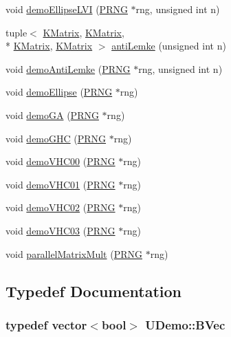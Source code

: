 \begin{DoxyCompactItemize}
\item 
void \hyperlink{namespace_u_demo_ae2d055dcadc44738d44dd94e8fb22365}{demo\-Ellipse\-L\-V\-I} (\hyperlink{class_k_base_1_1_p_r_n_g}{P\-R\-N\-G} $\ast$rng, unsigned int n)
\item 
tuple$<$ \hyperlink{class_k_base_1_1_k_matrix}{K\-Matrix}, \hyperlink{class_k_base_1_1_k_matrix}{K\-Matrix}, \\*
\hyperlink{class_k_base_1_1_k_matrix}{K\-Matrix}, \hyperlink{class_k_base_1_1_k_matrix}{K\-Matrix} $>$ \hyperlink{namespace_u_demo_ab5f1c490cbcf10b636e842c296660839}{anti\-Lemke} (unsigned int n)
\item 
void \hyperlink{namespace_u_demo_aef84eccfcd37c2b2a9ecd615cd6fe0d5}{demo\-Anti\-Lemke} (\hyperlink{class_k_base_1_1_p_r_n_g}{P\-R\-N\-G} $\ast$rng, unsigned int n)
\item 
void \hyperlink{namespace_u_demo_af8246a8ce2e14aa232a0f33795ced5eb}{demo\-Ellipse} (\hyperlink{class_k_base_1_1_p_r_n_g}{P\-R\-N\-G} $\ast$rng)
\item 
void \hyperlink{namespace_u_demo_adac022980ecd7d991bb84df4eb866d55}{demo\-G\-A} (\hyperlink{class_k_base_1_1_p_r_n_g}{P\-R\-N\-G} $\ast$rng)
\item 
void \hyperlink{namespace_u_demo_aea15b24e19367171016a278dd77d1fd4}{demo\-G\-H\-C} (\hyperlink{class_k_base_1_1_p_r_n_g}{P\-R\-N\-G} $\ast$rng)
\item 
void \hyperlink{namespace_u_demo_a8fbc519a5705651a36334568bbf49fb1}{demo\-V\-H\-C00} (\hyperlink{class_k_base_1_1_p_r_n_g}{P\-R\-N\-G} $\ast$rng)
\item 
void \hyperlink{namespace_u_demo_a118b5e21dc5017be5c67ebc7cdaf0ffd}{demo\-V\-H\-C01} (\hyperlink{class_k_base_1_1_p_r_n_g}{P\-R\-N\-G} $\ast$rng)
\item 
void \hyperlink{namespace_u_demo_a461edce07dee22a26059481b8d8c173f}{demo\-V\-H\-C02} (\hyperlink{class_k_base_1_1_p_r_n_g}{P\-R\-N\-G} $\ast$rng)
\item 
void \hyperlink{namespace_u_demo_a50316f5d3a03fcdddc7451745d959e2e}{demo\-V\-H\-C03} (\hyperlink{class_k_base_1_1_p_r_n_g}{P\-R\-N\-G} $\ast$rng)
\item 
void \hyperlink{namespace_u_demo_aa94cfbad112ae0115708c08482d929a5}{parallel\-Matrix\-Mult} (\hyperlink{class_k_base_1_1_p_r_n_g}{P\-R\-N\-G} $\ast$rng)
\end{DoxyCompactItemize}


\subsection{Typedef Documentation}
\hypertarget{namespace_u_demo_a18a17f7d582322b46be0f2a8add9fb4e}{
\subsubsection[{B\-Vec}]{\setlength{\rightskip}{0pt plus 5cm}typedef vector$<$bool$>$ {\bf U\-Demo\-::\-B\-Vec}}}\label{namespace_u_demo_a18a17f7d582322b46be0f2a8add9fb4e}


